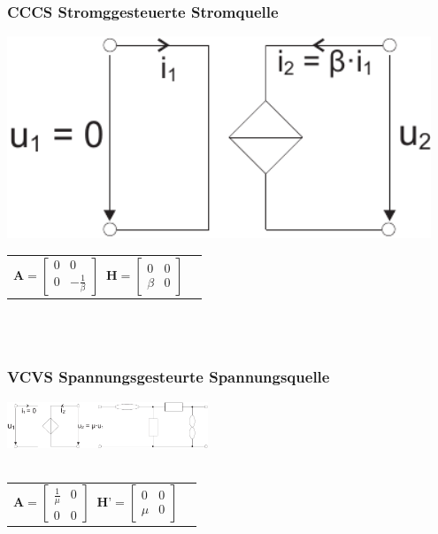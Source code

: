\documentclass[a4paper,twocolumn,10pt]{article}
\begin{document}
\subsubsection*{CCCS Stromggesteuerte Stromquelle}
\begin{minipage}[b]{0.23\textwidth}
\includegraphics[width=0.95\textwidth]{Grafiken/OP_ISI}
\end{minipage}
\hfill
\begin{minipage}[b]{0.23\textwidth}
\begin{tabular}{ll}
$\textbf{A}=\begin{bmatrix}0 & 0\\ 0 & -\frac{1}{\beta}\end{bmatrix}\;\;\textbf{H}=\begin{bmatrix}0 & 0\\ \beta & 0\end{bmatrix}$
\end{tabular}\\\\
\end{minipage}

\subsubsection*{VCVS Spannungsgesteurte Spannungsquelle}
\includegraphics[width=0.45\textwidth]{Grafiken/OP_USU}\\\\
\begin{tabular}{ll}
$\textbf{A}=\begin{bmatrix}\frac{1}{\mu} & 0\\ 0 & 0\end{bmatrix}\;\;\textbf{H'}=\begin{bmatrix}0 & 0\\ \mu & 0\end{bmatrix}$
\end{tabular}
\end{document}
